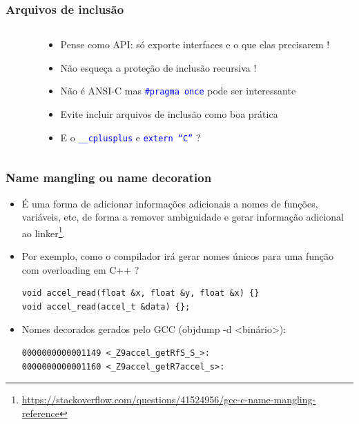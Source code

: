 \documentclass{beamer}
\begin{document}
\begin{frame}
	\frametitle{Arquivos de inclusão}
	\begin{columns}[T] %
		\begin{column}{.60\textwidth}
			
		\end{column}%
		\hfill%
		\begin{column}{.40\textwidth}
			\begin{itemize}
				\item Pense como API: só exporte interfaces e o que elas precisarem !
				\item Não esqueça a proteção de inclusão recursiva !
				\item Não é ANSI-C mas \texttt{\textcolor{blue}{\#pragma once}} pode ser interessante
				\item Evite incluir arquivos de inclusão como boa prática
                \item E o \texttt{\textcolor{blue}{\_\_cplusplus}} e \texttt{\textcolor{blue}{extern ``C''}} ?
			\end{itemize}
		\end{column}%
	\end{columns}
\end{frame}

\begin{frame}[fragile]
	\frametitle{Name mangling ou name decoration}
		\begin{itemize}
			\item É uma forma de adicionar informações adicionais a nomes de funções, variáveis, etc, de forma a remover ambiguidade e gerar informação adicional ao linker\footnote{{\tiny\url{ https://stackoverflow.com/questions/41524956/gcc-c-name-mangling-reference}}}.
			\item Por exemplo, como o compilador irá gerar nomes únicos para uma função com overloading em C++ ?
            	\begin{lstlisting}[style=customc]
void accel_read(float &x, float &y, float &x) {}
void accel_read(accel_t &data) {};
            	\end{lstlisting}
               \item Nomes decorados gerados pelo GCC (objdump -d <binário>):
            	\begin{lstlisting}[style=customc]
0000000000001149 <_Z9accel_getRfS_S_>:
0000000000001160 <_Z9accel_getR7accel_s>:
            	\end{lstlisting}
		\end{itemize}
\end{frame}
\end{document}
